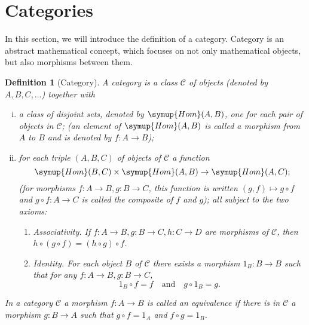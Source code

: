 \documentclass{assignment}[2019/10/15]
\theoremstyle{plain}
\newtheorem{definition}[theorem]{Definition}
\newcommand{\SC}{\mathscr{C}}
\newcommand{\Hom}{\mathop{}\!\symup{Hom}}
\numberwithin{equation}{section}
\begin{document}
    \section{Categories}

    In this section, we will introduce the definition of a category. Category is an abstract mathematical concept, which focuses on not only mathematical objects, but also morphisms between them.

    \begin{definition}[Category]
        A \emph{category} is a class $\mathscr{C}$ of objects (denoted by $A, B, C, \dotsc$) together with
        \begin{enumerate}[(i)]
            \item a class of disjoint sets, denoted by $\Hom(A, B)$, one for each pair of objects in $\mathscr{C}$; (an element of $\Hom(A, B)$ is called a \emph{morphism} from $A$ to $B$ and is denoted by $f\colon A\to B$);
            \item for each triple $(A, B, C)$ of objects of $\mathscr{C}$ a function
            \begin{equation}
                \Hom(B, C)\times \Hom(A, B)\to \Hom(A, C);
            \end{equation}
            (for morphisms $f\colon A\to B, g\colon B\to C$, this function is written $(g, f)\mapsto g\circ f$ and $g\circ f\colon A\to C$ is called the \emph{composite} of $f$ and $g$); all subject to the two axioms:
            \begin{enumerate}[\hspace{-1em}(I)]
                \item Associativity. If $f\colon A\to B, g\colon B\to C, h\colon C\to D$ are morphisms of $\SC$, then $h\circ (g\circ f) = (h\circ g)\circ f$.
                \item Identity. For each object $B$ of $\SC$ there exists a morphism $1_B\colon B\to B$ such that for any $f\colon A\to B, g\colon B\to C$,
                \begin{equation}
                    1_B \circ f = f\quad\text{and}\quad g\circ 1_B = g.
                \end{equation}
            \end{enumerate}
        \end{enumerate}

        In a category $\SC$ a morphism $f\colon A\to B$ is called an \emph{equivalence} if there is in $\SC$ a morphism $g\colon B\to A$ such that $g\circ f = 1_A$ and $f\circ g = 1_B$.
    \end{definition}
\end{document}
